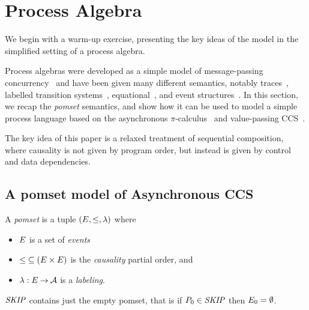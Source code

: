 \section{Process Algebra}

We begin with a warm-up exercise, presenting the key ideas of the
model in the simplified setting of a process algebra.

Process algebras were developed as a simple model of message-passing
concurrency~\cite{CCS,CSP,ACP} and have been given many different
semantics, notably traces~\cite{???}, labelled transition
systems~\cite{???}, equational~\cite{???}, and event
structures~\cite{???}.  In this section, we recap the \emph{pomset}
semantics, and show how it can be used to model a simple process
language based on the asynchronous $\pi$-calculus~\cite{???} and
value-passing CCS~\cite{???}.

The key idea of this paper is a relaxed treatment of sequential
composition, where causality is not given by program order, but
instead is given by control and data dependencies.

\subsection{A pomset model of Asynchronous CCS}

\begin{definition}
  A \emph{pomset} is a tuple
  $(E, {\le}, \lambda)$ where
  \begin{itemize}
  \item $E$ is a set of \emph{events}
  \item
    ${\le} \subseteq (E\times E)$ is the \emph{causality} partial order, and
  \item
    $\lambda: E \mathbin\rightarrow \mathcal{A}$ is a \emph{labeling}.
  \end{itemize}
\end{definition}

\begin{definition}
  $\mathit{SKIP}$ contains just the empty pomset, that is if $P_0\in\mathit{SKIP}$ then
  $E_0 = \emptyset$.
\end{definition}

